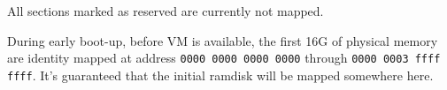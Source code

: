 \documentclass[11pt]{letter}
\begin{document}
All sections marked as reserved are currently not mapped.

During early boot-up, before VM is available, the first 16G of physical memory are identity mapped at address \texttt{0000 0000 0000 0000} through \texttt{0000 0003 ffff ffff}. It's guaranteed that the initial ramdisk will be mapped somewhere here. 
\end{document}
